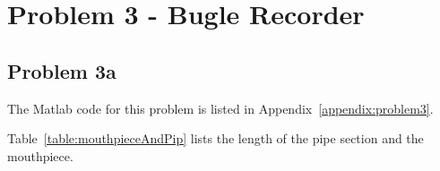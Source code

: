 \newpage
\section*{Problem 3 - Bugle Recorder}


\vspace{-0.25cm}
\subsection*{Problem 3a}

The Matlab code for this problem is listed in Appendix~\ref{appendix:problem3}.

\vspace{0.25cm}
Table~\ref{table:mouthpieceAndPip} lists the length of the pipe section and the mouthpiece.

\setlength{\abovecaptionskip}{0pt}
\vspace{0.1cm}
